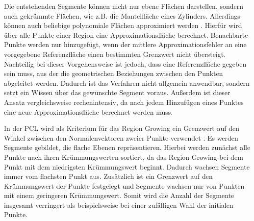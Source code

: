 Die entstehenden Segmente können nicht nur ebene Flächen darstellen, sondern  auch gekrümmte Flächen, wie z.B. die Mantelfläche eines Zylinders. Allerdings können auch beliebige polynomiale Flächen approximiert werden \cite{Wilke2002}. Hierfür wird über alle Punkte einer Region eine Approximationsfläche berechnet. Benachbarte Punkte werden nur hinzugefügt, wenn der mittlere Approximationsfehler an eine vorgegebene Referenzfläche einen bestimmten Grenzwert nicht übersteigt. Nachteilig bei dieser Vorgehensweise ist jedoch, dass eine Referenzfläche gegeben sein muss, aus der die geometrischen Beziehungen zwischen den Punkten abgeleitet werden. Dadurch ist das Verfahren nicht allgemein anwendbar, sondern setzt ein Wissen über das gewünschte Segment voraus. Außerdem ist dieser Ansatz vergleichsweise rechenintensiv, da nach jedem Hinzufügen eines Punktes eine neue Approximationsfläche berechnet werden muss.

In der PCL wird als Kriterium für das Region Growing ein Grenzwert auf den Winkel zwischen den Normalenvektoren zweier Punkte verwendet \cite{PCLRG2020}. Es werden Segmente gebildet, die flache Ebenen repräsentieren. Hierbei werden zunächst alle Punkte nach ihren Krümmungswerten sortiert, da das Region Growing bei dem Punkt mit dem niedrigsten Krümmungswert beginnt. Dadurch wachsen Segmente immer vom flachsten Punkt aus. Zusätzlich ist ein Grenzwert auf den Krümmungswert der Punkte festgelegt und Segmente wachsen nur von Punkten mit einem geringeren Krümmungswert. Somit wird die Anzahl der Segmente insgesamt verringert als beispielsweise bei einer zufälligen Wahl der initialen Punkte. 

